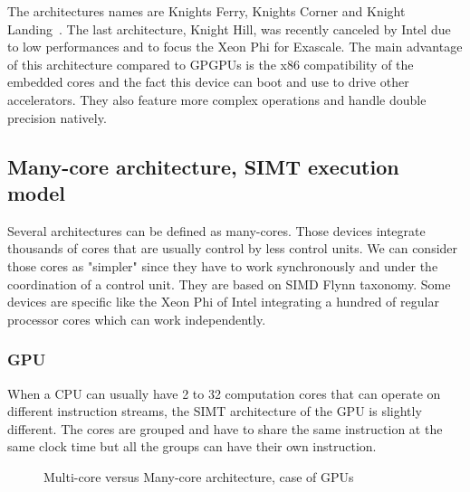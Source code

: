 The architectures names are Knights Ferry, Knights Corner and Knight Landing~\cite{sodani2016knights}. 
The last architecture, Knight Hill, was recently canceled by Intel due to low performances and to focus the Xeon Phi for Exascale.
The main advantage of this architecture compared to GPGPUs is the x86 compatibility of the embedded cores and the fact this device can boot and use to drive other accelerators. 
They also feature more complex operations and handle double precision natively.

\subsection{Many-core architecture, SIMT execution model}
Several architectures can be defined as many-cores. 
Those devices integrate thousands of cores that are usually control by less control units. 
We can consider those cores as "simpler" since they have to work synchronously and under the coordination of a control unit.
They are based on SIMD Flynn taxonomy. 
Some devices are specific like the Xeon Phi of Intel integrating a hundred of regular processor cores which can work independently. 

\subsubsection{GPU}
When a CPU can usually have 2 to 32 computation cores that can operate on different instruction streams, the SIMT architecture of the GPU is slightly different. 
The cores are grouped and have to share the same instruction at the same clock time but all the groups can have their own instruction. 

\begin{figure}
\begin{center}
\hspace{1cm}
\end{center}
\caption{Multi-core versus Many-core architecture, case of GPUs}
\label{fig:2_HARD:gpu}
\end{figure}

